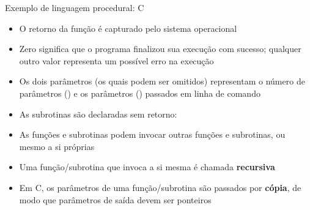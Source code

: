 \begin{frame}[fragile]{Exemplo de linguagem procedural: C}

    \begin{itemize}
        \item O retorno da função  é capturado pelo sistema operacional

        \item Zero significa que o programa finalizou sua execução com sucesso; qualquer outro
            valor representa um possível erro na execução

        \item Os dois parâmetros (os quais podem ser omitidos) representam o número de parâmetros
            () e os parâmetros () passados em linha de comando

        \item As subrotinas são declaradas sem retorno:


        \item As funções e subrotinas podem invocar outras funções e subrotinas, ou mesmo a si
            próprias

        \item Uma função/subrotina que invoca a si mesma é chamada \textbf{recursiva}

        \item Em C, os parâmetros de uma função/subrotina são passados por \textbf{cópia}, de 
            modo que parâmetros de saída devem ser ponteiros 
    \end{itemize}

\end{frame}

